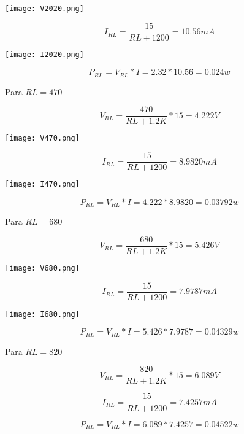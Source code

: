 \documentclass[a4paper, 11pt]{article}
\begin{document}
\texttt{[image: V2020.png]}

\begin{equation*}
I_{RL}=\frac{15}{RL+1200}=10.56mA
\end{equation*}

\texttt{[image: I2020.png]}

\begin{equation*}
P_{RL}=V_{RL}*I=2.32*10.56=0.024w
\end{equation*}

Para $RL=470$

\begin{equation*}
V_{RL}=\frac{470}{RL+1.2K}*15=4.222V
\end{equation*}

\texttt{[image: V470.png]}

\begin{equation*}
I_{RL}=\frac{15}{RL+1200}=8.9820mA
\end{equation*}

\texttt{[image: I470.png]}

\begin{equation*}
P_{RL}=V_{RL}*I=4.222*8.9820=0.03792w
\end{equation*}

Para $RL=680$

\begin{equation*}
V_{RL}=\frac{680}{RL+1.2K}*15=5.426V
\end{equation*}

\texttt{[image: V680.png]}

\begin{equation*}
I_{RL}=\frac{15}{RL+1200}=7.9787mA
\end{equation*}

\texttt{[image: I680.png]}

\begin{equation*}
P_{RL}=V_{RL}*I=5.426*7.9787=0.04329w
\end{equation*}

Para $RL=820$

\begin{equation*}
V_{RL}=\frac{820}{RL+1.2K}*15=6.089V
\end{equation*}

\begin{equation*}
I_{RL}=\frac{15}{RL+1200}=7.4257mA
\end{equation*}

\begin{equation*}
P_{RL}=V_{RL}*I=6.089*7.4257=0.04522w
\end{equation*}
\end{document}

